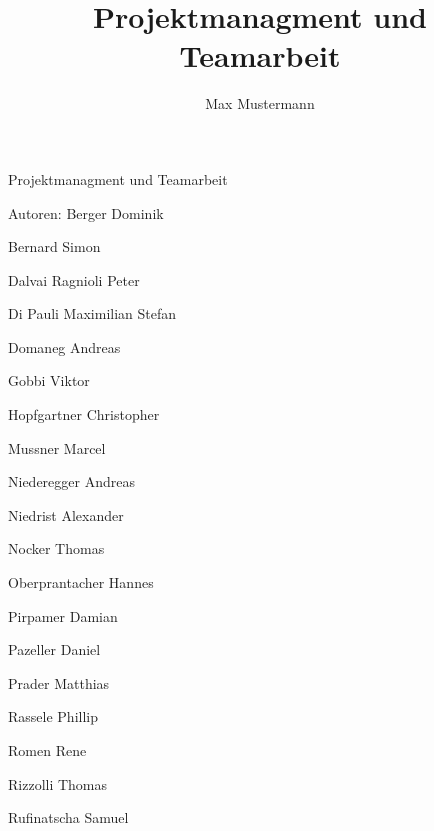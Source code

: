 \documentclass{article}
\title{Projektmanagment und Teamarbeit}
\author{Max Mustermann}
\begin{document}
\begin{center}



Projektmanagment und Teamarbeit

Autoren: Berger Dominik

Bernard Simon

Dalvai Ragnioli Peter

Di Pauli Maximilian Stefan

Domaneg Andreas

Gobbi Viktor

Hopfgartner Christopher

Mussner Marcel

Niederegger Andreas

Niedrist Alexander

Nocker Thomas

Oberprantacher Hannes

Pirpamer Damian

Pazeller Daniel

Prader Matthias

Rassele Phillip

Romen Rene

Rizzolli Thomas

Rufinatscha Samuel
\end{center}
\newpage
\tableofcontents






















\end{document}
